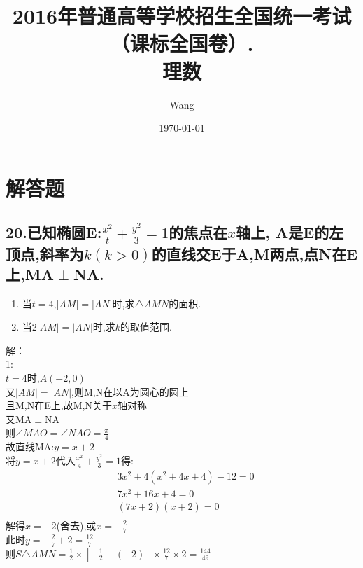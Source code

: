 \documentclass[UTF8]{ctexart}
\begin{document}
\title{2016年普通高等学校招生全国统一考试
    （课标全国卷\uppercase\expandafter{}）.\\
    \textbf{理数}}
\author{Wang}
\date{\today}
\maketitle

\section{解答题}
\subsection{20.已知椭圆E:$\frac{x^2}{t}+\frac{y^2}{3}=1$的焦点在$x$轴上,
    A是E的左顶点,斜率为$k(k>0)$的直线交E于A,M两点,点N在E上,MA$\perp$NA.}
\begin{enumerate}
    \item 当$t=4$,$|AM|=|AN|$时,求$\triangle AMN$的面积.
    \item 当$2|AM|=|AN|$时,求$k$的取值范围.
\end{enumerate}
解：\\
1:\\
$t=4$时,$A(-2,0)$\\
又$|AM|=|AN|$,则M,N在以A为圆心的圆上\\
且M,N在E上,故M,N关于$x$轴对称\\
又MA$\perp$NA\\
则$\angle MAO= \angle NAO=\frac{\pi}{4} $\\
故直线MA:$y=x+2$\\
将$ y=x+2 $代入$\frac{x^2}{4}+\frac{y^2}{3}=1$得: \\
\[
    \begin{aligned}
         & 3x^2+4(x^2+4x+4)-12=0 \\
         & 7x^2+16x+4=0          \\
         & (7x+2)(x+2)=0         \\
    \end{aligned}
\]
解得$ x=-2$(舍去),或$x=-\frac{2}{7}$\\
此时$y=-\frac{2}{7}+2=\frac{12}{7}$\\
则$S\triangle AMN=\frac{1}{2}\times [-\frac{1}{2}-(-2)]\times \frac{12}{7}\times 2=\frac{144}{49}$\\
\end{document}
